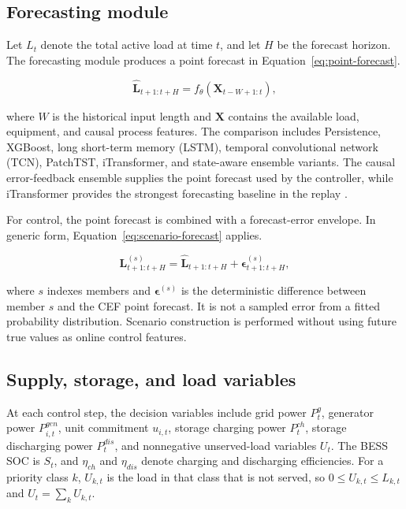 \subsection{Forecasting module}\label{forecasting-module}

Let $L_t$ denote the total active load at time $t$, and let $H$ be the
forecast horizon. The forecasting module produces a point forecast in
Equation~\eqref{eq:point-forecast}.

\begin{equation}
\label{eq:point-forecast}
\hat{\mathbf L}_{t+1:t+H}=f_\theta(\mathbf X_{t-W+1:t}),
\end{equation}

where $W$ is the historical input length and $\mathbf X$ contains the
available load, equipment, and causal process features. The comparison
includes Persistence, XGBoost, long short-term memory (LSTM), temporal
convolutional network (TCN), PatchTST, iTransformer, and state-aware ensemble
variants. The causal error-feedback ensemble supplies the point forecast used
by the controller, while iTransformer provides the strongest forecasting
baseline in the replay \citep{lim2021tft,nie2023patchtst,liu2024itransformer}.

For control, the point forecast is combined with a forecast-error
envelope. In generic form, Equation~\eqref{eq:scenario-forecast} applies.

\begin{equation}
\label{eq:scenario-forecast}
\mathbf L^{(s)}_{t+1:t+H}=\hat{\mathbf L}_{t+1:t+H}+\boldsymbol\epsilon^{(s)}_{t+1:t+H},
\end{equation}

where $s$ indexes members and $\boldsymbol\epsilon^{(s)}$ is the deterministic
difference between member $s$ and the CEF point forecast. It is not a sampled
error from a fitted probability distribution. Scenario construction is
performed without using future true values as online control features.

\subsection{Supply, storage, and load
variables}\label{supply-storage-and-load-variables}

At each control step, the decision variables include grid power
$P^g_t$, generator power $P^{gen}_{i,t}$, unit commitment $u_{i,t}$,
storage charging power $P^{ch}_t$, storage discharging power $P^{dis}_t$,
and nonnegative unserved-load variables $U_t$. The BESS SOC is $S_t$,
and $\eta_{ch}$ and $\eta_{dis}$ denote charging and discharging
efficiencies. For a priority class $k$, $U_{k,t}$ is the load in that
class that is not served, so $0\leq U_{k,t}\leq L_{k,t}$ and
$U_t=\sum_k U_{k,t}$.

